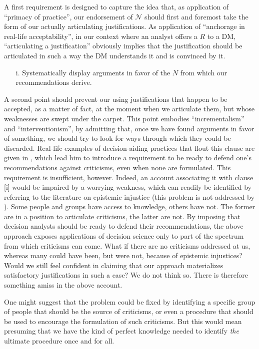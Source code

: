 \documentclass[preprint, french, english, 11pt, authoryear]{elsarticle}%
\newcommand{\adv}{\mathscr{N}}
\begin{document}
A first requirement is designed to capture the idea that, as application of “primacy of practice”, our endorsement of $\adv$ should first and foremost take the form of our actually articulating justifications. As application of ``anchorage in real-life acceptability'', in our context where an analyst offers a $R$ to a \ac{DM}, ``articulating a justification'' obviously implies that the justification should be articulated in such a way the \ac{DM} understands it and is convinced by it.

\begin{itemize}
\item[i.]	Systematically display arguments in favor of the $N$ from which our recommendations derive.
\end{itemize}
A second point should prevent our using justifications that happen to be accepted, as a matter of fact, at the moment when we articulate them, but whose weaknesses are swept under the carpet. This point embodies “incrementalism” and ``interventionism'', by admitting that, once we have found arguments in favor of something, we should try to look for ways through which they could be discarded. Real-life examples of decision-aiding practices that flout this clause are given in \cite{meinard_what_2017}, which lead him to introduce a requirement to be ready to defend one's recommendations against criticisms, even when none are formulated. This requirement is insufficient, however. Indeed, an account associating it with clause [i] would be impaired by a worrying weakness, which can readily be identified by referring to the literature on epistemic injustice \citep{fricker_epistemic_2007} (this problem is not addressed by \cite{meinard_what_2017}). Some people and groups have access to knowledge, others have not. The former are in a position to articulate criticisms, the latter are not. By imposing that decision analysts should be ready to defend their recommendations, the above approach exposes applications of decision science only to part of the spectrum from which criticisms can come. What if there are no criticisms addressed at us, whereas many could have been, but were not, because of epistemic injustices? Would we still feel confident in claiming that our approach materializes satisfactory justifications in such a case? We do not think so. There is therefore something amiss in the above account.

One might suggest that the problem could be fixed by identifying a specific group of people that should be the source of criticisms, or even a procedure that should be used to encourage the formulation of such criticisms. But this would mean presuming that we have the kind of perfect knowledge needed to identify \emph{the} ultimate procedure once and for all.
\end{document}
